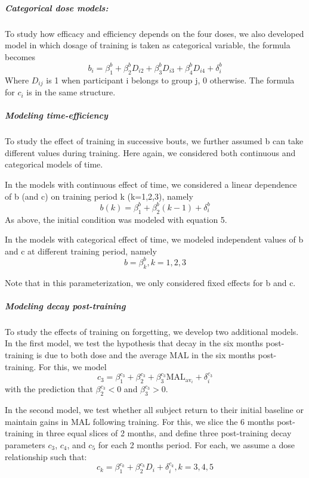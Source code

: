 \subparagraph{Categorical dose models: } 
To study how efficacy and efficiency depends on the four doses, we also developed model in which dosage of training is taken as categorical variable, the formula becomes
\begin{equation}
	b_i = \beta_1^b + \beta_2^b D_{i2} + \beta_3^b D_{i3} + \beta_4^b D_{i4} + \delta_i^b
\end{equation}
Where $ D_{ij} $ is 1 when participant i belongs to group j, 0 otherwise. 
The formula for $ c_i $ is in the same structure.

\subparagraph{Modeling time-efficiency}
To study the effect of training in successive bouts, we further assumed b can take different values during training. 
Here again, we considered both continuous and categorical models of time.

In the models with continuous effect of time, we considered a linear dependence of b (and c) on training period k (k=1,2,3), namely
\begin{equation}\label{eqn:timingcat}
	b(k) = \beta_1^b + \beta_2^b (k-1) + \delta_i^b
\end{equation}
As above, the initial condition was modeled with equation 5.  

In the models with categorical effect of time, we modeled independent values of b and c at different training period, namely
\begin{equation}
	b = \beta_k^b,  k = 1,2,3
\end{equation}

Note that in this parameterization, we only considered fixed effects for b and c.

\subparagraph{Modeling decay post-training}
To study the effects of training on forgetting, we develop two additional models. 
In the first model, we test the hypothesis that decay in the six months post-training is due to both dose and the average MAL in the six months post-training. 
For this, we model 
\begin{equation}
	c_3 = \beta_1^{c_3} + \beta_2^{c_3} + \beta_3^{c_3}\text{MAL}_{\text{av}_i} + \delta_i^{c_3}
\end{equation}
with the prediction that $ \beta_2^{c_3} < 0 $ and $ \beta_3^{c_3} > 0 $.

In the second model, we test whether all subject return to their initial baseline or maintain gains in MAL following training.
For this, we slice the 6 months post-training in three equal slices of 2 months, and define three post-training decay parameters $ c_3 $, $ c_4 $, and $ c_5 $ for each 2 months period. 
For each, we assume a dose relationship such that: 
\begin{equation}
	c_k = \beta_1^{c_k} + \beta_2^{c_k} D_i + \delta_i^{c_k}, k = 3,4,5
\end{equation}

